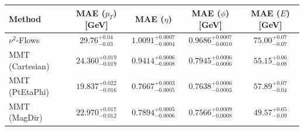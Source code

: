     \begin{tabular}{lcccc}
        \toprule
        Method & MAE ($p_T$) [GeV] & MAE ($\eta$) & MAE ($\phi$) [GeV] & MAE ($E$) [GeV] \\
        \midrule
        $\nu^2$-Flows & $29.76^{+0.04}_{-0.03}$ & $1.0091^{+0.0007}_{-0.0004}$ & $0.9686^{+0.0007}_{-0.0010}$ & $75.00^{+0.07}_{-0.07}$ \\
        MMT (Cartesian) & $24.360^{+0.019}_{-0.019}$ & $0.9414^{+0.0006}_{-0.0008}$ & $0.7945^{+0.0006}_{-0.0006}$ & $55.15^{+0.06}_{-0.08}$ \\
        MMT (PtEtaPhi) & $19.837^{+0.022}_{-0.016}$ & $0.7667^{+0.0003}_{-0.0005}$ & $0.7638^{+0.0006}_{-0.0003}$ & $57.89^{+0.07}_{-0.04}$ \\
        MMT (MagDir) & $22.970^{+0.017}_{-0.012}$ & $0.7894^{+0.0005}_{-0.0006}$ & $0.7566^{+0.0009}_{-0.0008}$ & $49.57^{+0.05}_{-0.09}$ \\
        \bottomrule
    \end{tabular}